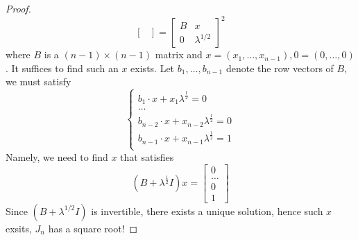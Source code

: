 \begin{proof}
\begin{equation*}
\begin{bmatrix}
            \end{bmatrix}=\begin{bmatrix}
                B&x\\
                0&\lambda^{1/2}
            \end{bmatrix}^2
        \end{equation*}
        where $B$ is a $(n-1)\times (n-1)$ matrix and $x=(x_1,\dots,x_{n-1}), 0=(0,\dots,0)$. It suffices to find such an $x$ exists. Let $b_1,\dots,b_{n-1}$ denote the row vectors of $B$, we must satisfy 
        \begin{equation*}
            \begin{cases}
                b_1\cdot x+x_1\lambda^\frac{1}{2}=0\\
                \dots\\
                b_{n-2}\cdot x+x_{n-2}\lambda^\frac{1}{2}=0\\
                b_{n-1}\cdot x+x_{n-1}\lambda^\frac{1}{2}=1\\
            \end{cases}
        \end{equation*}
        Namely, we need to find $x$ that satisfies 
        \begin{equation*}
            (B+\lambda^\frac{1}{2}I)x=\begin{bmatrix}
                0\\
                \dots\\
                0\\
                1
            \end{bmatrix}
        \end{equation*}
        Since $(B+\lambda^{1/2}I)$ is invertible, there exists a unique solution, hence such $x$ exsits, $J_n$ has a square root! 
\end{proof}



